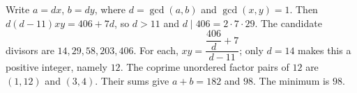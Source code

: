 Write $a=dx$, $b=dy$, where $d=\gcd(a,b)$ and $\gcd(x,y)=1$. Then $d(d-11)xy=406+7d$, so $d>11$ and $d\mid406=2\cdot7\cdot29$. The candidate divisors are $14,29,58,203,406$. For each, $xy=\dfrac{\dfrac{406}{d}+7}{d-11}$; only $d=14$ makes this a positive integer, namely $12$. The coprime unordered factor pairs of $12$ are $(1,12)$ and $(3,4)$. Their sums give $a+b=182$ and $98$. The minimum is $\boxed{98}$.
